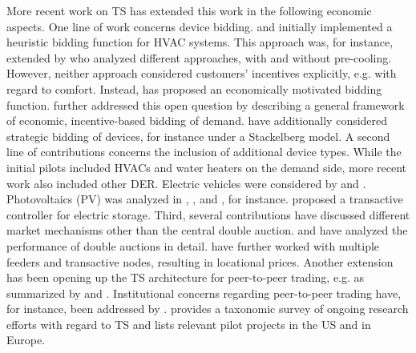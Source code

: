More recent work on TS has extended this work in the following economic aspects. 
One line of work concerns device bidding.
\citet{PNNL2006} and \citet{hammerstrom_2008} initially implemented a heuristic bidding function for HVAC systems. This approach was, for instance, extended by \citet{adhikari_simulation_2016} who analyzed different approaches, with and without pre-cooling.
However, neither approach considered customers' incentives explicitly, e.g. with regard to comfort.
Instead, \citet{Arlt2020} has proposed an economically motivated bidding function.
\citet{widergren_transactive_2017} further addressed this open question by describing a general framework of economic, incentive-based bidding of demand.
\citet{lian_transactive_2020} have additionally considered strategic bidding of devices, for instance under a Stackelberg model.
A second line of contributions concerns the inclusion of additional device types. While the initial pilots included HVACs and water heaters on the demand side, more recent work also included other DER.
Electric vehicles were considered by \citet{behboodi_integration_2016} and \citet{behboodi_electric_2016}. 
Photovoltaics (PV) was analyzed in \citet{sajjadi_transactive_2016}, \citet{ableitner_user_2020}, and \citet{mengelkamp_decentralizing_2018}, for instance.
\citet{parandehgheibi_two-layer_2017} proposed a transactive controller for electric storage.
Third, several contributions have discussed different market mechanisms other than the central double auction. \citet{fuller_analysis_2011} and \citet{Arlt2020} have analyzed the performance of double auctions in detail. \citet{widergren_residential_2014} have further worked with multiple feeders and transactive nodes, resulting in locational prices. Another extension has been opening up the TS architecture for peer-to-peer trading, e.g. as summarized by \citet{zhang_review_2017} and \citet{sousa_peer--peer_2019}.
Institutional concerns regarding peer-to-peer trading have, for instance, been addressed by \citet{masiello_sharing_2016}.
\citet{abrishambaf_towards_2019} provides a taxonomic survey of ongoing research efforts with regard to TS and lists relevant pilot projects in the US and in Europe. 

